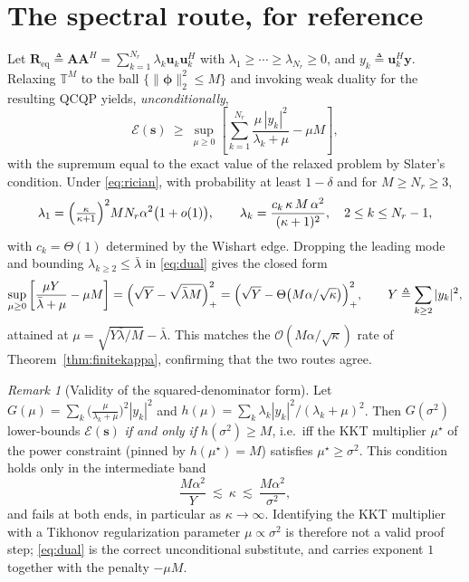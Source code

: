 \documentclass[11pt]{article}
\theoremstyle{remark}
\newtheorem{remark}{Remark}
\begin{document}
\section{The spectral route, for reference}

Let
$\mathbf{R}_{\mathrm{eq}}\triangleq\mathbf{A}\mathbf{A}^{H}
 =\sum_{k=1}^{N_r}\lambda_k\mathbf{u}_k\mathbf{u}_k^{H}$
with $\lambda_1\ge\cdots\ge\lambda_{N_r}\ge0$, and
$y_k\triangleq\mathbf{u}_k^{H}\mathbf{y}$. Relaxing $\mathbb{T}^{M}$ to the ball
$\{\|\boldsymbol{\phi}\|_2^2\le M\}$ and invoking weak duality for the resulting
QCQP yields, \emph{unconditionally},
\begin{equation}
\mathcal{E}(\mathbf{s})\ \ge\ \sup_{\mu\ge0}
\left[\sum_{k=1}^{N_r}\frac{\mu\,|y_k|^2}{\lambda_k+\mu}-\mu M\right],
\label{eq:dual}
\end{equation}
with the supremum equal to the exact value of the relaxed problem by Slater's
condition. Under \eqref{eq:rician}, with probability at least $1-\delta$ and for
$M\ge N_r\ge3$,
\begin{equation}
\lambda_1=\Bigl(\tfrac{\kappa}{\kappa+1}\Bigr)^{2}MN_r\alpha^2
          \bigl(1+o(1)\bigr),
\qquad
\lambda_k=\frac{c_k\,\kappa\,M\,\alpha^2}{(\kappa+1)^2},
\quad 2\le k\le N_r-1,
\label{eq:eigs}
\end{equation}
with $c_k=\Theta(1)$ determined by the Wishart edge. Dropping the leading mode
and bounding $\lambda_{k\ge2}\le\bar\lambda$ in \eqref{eq:dual} gives the closed
form
\begin{equation}
\sup_{\mu\ge0}\left[\frac{\mu Y}{\bar\lambda+\mu}-\mu M\right]
=\Bigl(\sqrt{Y}-\sqrt{\bar\lambda M}\Bigr)_{+}^{2}
=\Bigl(\sqrt{Y}-\Theta\bigl(M\alpha/\sqrt{\kappa}\bigr)\Bigr)_{+}^{2},
\qquad
Y\triangleq\sum_{k\ge2}|y_k|^2,
\label{eq:closedform}
\end{equation}
attained at $\mu=\sqrt{Y\bar\lambda/M}-\bar\lambda$. This matches the
$\mathcal{O}(M\alpha/\sqrt{\kappa})$ rate of Theorem~\ref{thm:finitekappa},
confirming that the two routes agree.

\begin{remark}[Validity of the squared-denominator form]
\label{rem:errata}
Let
$G(\mu)=\sum_k\bigl(\tfrac{\mu}{\lambda_k+\mu}\bigr)^2|y_k|^2$ and
$h(\mu)=\sum_k\lambda_k|y_k|^2/(\lambda_k+\mu)^2$. Then $G(\sigma^2)$
lower-bounds $\mathcal{E}(\mathbf{s})$ \emph{if and only if}
$h(\sigma^2)\ge M$, i.e.\ iff the KKT multiplier $\mu^{\star}$ of the power
constraint (pinned by $h(\mu^{\star})=M$) satisfies $\mu^{\star}\ge\sigma^2$.
This condition holds only in the intermediate band
\begin{equation}
\frac{M\alpha^2}{Y}\ \lesssim\ \kappa\ \lesssim\ \frac{M\alpha^2}{\sigma^2},
\label{eq:band}
\end{equation}
and fails at both ends, in particular as $\kappa\to\infty$. Identifying the KKT
multiplier with a Tikhonov regularization parameter $\mu\propto\sigma^2$ is
therefore not a valid proof step; \eqref{eq:dual} is the correct unconditional
substitute, and carries exponent $1$ together with the penalty $-\mu M$.
\end{remark}
\end{document}
